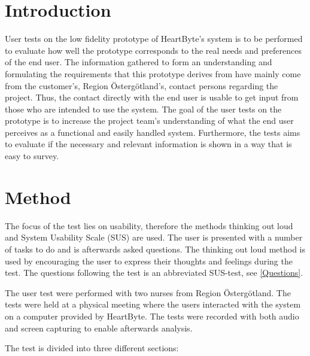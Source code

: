 \documentclass{article}
\begin{document}
	
	\clearpage
	
	
	\clearpage
	
	\tableofcontents
	\clearpage
	
	\section{Introduction}
	User tests on the low fidelity prototype of HeartByte's system is to be performed to evaluate how well the prototype corresponds to the real needs and preferences of the end user. The information gathered to form an understanding and formulating the requirements that this prototype derives from have mainly come from the customer's, Region Östergötland's, contact persons regarding the project. Thus, the contact directly with the end user is usable to get input from those who are intended to use the system. The goal of the user tests on the prototype is to increase the project team's understanding of what the end user perceives as a functional and easily handled system. Furthermore, the tests aims to evaluate if the necessary and relevant information is shown in a way that is easy to survey.
	
	\section{Method}
	The focus of the test lies on usability, therefore the methods thinking out loud and System Usability Scale (SUS) are used. The user is presented with a number of tasks to do and is afterwards asked questions. The thinking out loud method is used by encouraging the user to express their thoughts and feelings during the test. The questions following the test is an abbreviated SUS-test, see \ref{Questions}. 
	
	The user test were performed with two nurses from Region Östergötland. The tests were held at a physical meeting where the users interacted with the system on a computer provided by HeartByte. The tests were recorded with both audio and screen capturing to enable afterwards analysis. 
	
	The test is divided into three different sections:
	
\end{document}
